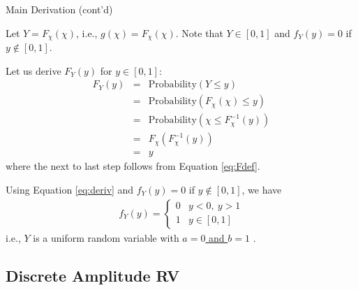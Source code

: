 %
%
\begin{slide}{Main Derivation (cont'd)}

\begin{titlelist}{}{}
\scriptsize
\item<2-> 
Let $Y=F_{\chi}(\chi)$, i.e., $g(\chi)=F_{\chi}(\chi)$.
Note that $Y \in [0,1]$ and $f_Y(y)=0$ if $y\not\in [0,1]$.

\item<3-> 
Let us derive $F_Y(y)$ for $y\in [0,1]$:
\begin{eqnarray*}
F_{Y}(y)&=&\mbox{Probability}(Y \leq y)\\
&=&\mbox{Probability}(F_{\chi}(\chi) \leq y)\\
&=&\mbox{Probability}(\chi \leq F_{\chi}^{-1}(y))\\
&=&F_{\chi}(F_{\chi}^{-1}(y)) \\
&=&y 
\end{eqnarray*}
where the next to last step follows from Equation \eqref{eq:Fdef}.

\item<4-> 
Using Equation \eqref{eq:deriv}  and $f_Y(y)=0$ if $y\not\in [0,1]$,
we have
\begin{eqnarray}
f_Y(y)=\left\{\begin{array}{ll}
0 & y<0,\ y>1 \\
1 & y\in [0,1]
\end{array}\right.
\end{eqnarray}
i.e., $Y$ is a uniform random variable with \hyperlink{unif}{$a=0$ and $b=1$} .

\end{titlelist}


\end{slide}

\subsection{Discrete Amplitude RV}


